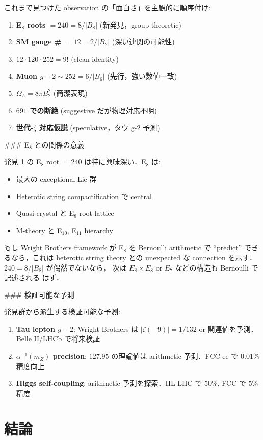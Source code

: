 \documentclass[11pt,a4paper]{article}
\begin{document}
これまで見つけた observation の「面白さ」を主観的に順序付け:

\begin{enumerate}
\item \textbf{E$_8$ roots $= 240 = 8/|B_8|$} (新発見，group theoretic)
\item \textbf{SM gauge \# $= 12 = 2/|B_2|$} (深い連関の可能性)
\item \textbf{$12 \cdot 120 \cdot 252 = 9!$} (clean identity)
\item \textbf{Muon $g-2 \sim 252 = 6/|B_6|$} (先行，強い数値一致)
\item \textbf{$\Omega_\Lambda = 8\pi B_2^2$} (簡潔表現)
\item \textbf{$691$ での断絶} (suggestive だが物理対応不明)
\item \textbf{世代-$\zeta$ 対応仮説} (speculative，タウ g-2 予測)
\end{enumerate}

### E$_8$ との関係の意義

発見 1 の E$_8$ root $= 240$ は特に興味深い．E$_8$ は:
\begin{itemize}
\item 最大の exceptional Lie 群
\item Heterotic string compactification で central
\item Quasi-crystal と E$_8$ root lattice
\item M-theory と E$_{10}$, E$_{11}$ hierarchy
\end{itemize}

もし Wright Brothers framework が E$_8$ を Bernoulli arithmetic で
``predict'' できるなら，これは heterotic string theory との
unexpected な connection を示す．$240 = 8/|B_8|$ が偶然でないなら，
次は $E_8 \times E_8$ or $E_7$ などの構造も Bernoulli で記述される
はず．

### 検証可能な予測

発見群から派生する検証可能な予測:
\begin{enumerate}
\item \textbf{Tau lepton $g-2$}: Wright Brothers は $|\zeta(-9)| = 1/132$
or 関連値を予測．Belle II/LHCb で将来検証
\item \textbf{$\alpha^{-1}(m_Z)$ precision}: $127.95$ の理論値は
arithmetic 予測．FCC-ee で $0.01\%$ 精度向上
\item \textbf{Higgs self-coupling}: arithmetic 予測を探索．HL-LHC で
$50\%$, FCC で $5\%$ 精度
\end{enumerate}

\section{結論}
\end{document}
